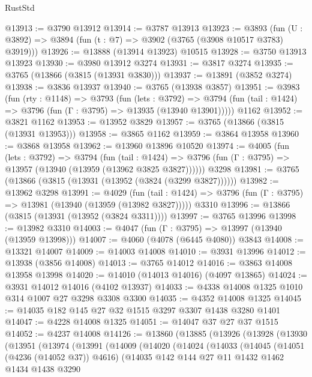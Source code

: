 \begin{lexlean}{RustStd}
\begin{coremodule}
@13913 := @3790 @13912
@13914 := @3787 @13913
@13923 := @3893
    (fun (U : @3892) => @3894 (fun (t : @7) => @3902 (@3765 (@3908 @10517 @3783) @3919)))
@13926 := @13888 (@13914 @13923) @10515
@13928 := @3750 @13913 @13923
@13930 := @3980 @13912 @3274
@13931 := @3817 @3274
@13935 := @3765 (@13866 (@3815 (@13931 @3830)))
@13937 := @13891 (@3852 @3274)
@13938 := @3836 @13937
@13940 := @3765 (@13938 @3857)
@13951 := @3983
    (fun (rty : @1148) =>
    @3793
      (fun (lets : @3792) =>
      @3794 (fun (tail : @1424) => @3796 (fun (Γ : @3795) => @13935 (@13940 @13901)))))
    @1162
@13952 := @3821 @1162
@13953 := @13952 @3829
@13957 := @3765 (@13866 (@3815 (@13931 @13953)))
@13958 := @3865 @1162
@13959 := @3864 @13958
@13960 := @3868 @13958
@13962 := @13960 @13896 @10520
@13974 := @4005
    (fun (lets : @3792) =>
    @3794
      (fun (tail : @1424) =>
      @3796 (fun (Γ : @3795) => @13957 (@13940 (@13959 (@13962 @3825 @3827))))))
    @3298
@13981 := @3765 (@13866 (@3815 (@13931 (@13952 (@3824 (@3299 @3827))))))
@13982 := @13962 @3298
@13991 := @4029
    (fun (tail : @1424) => @3796 (fun (Γ : @3795) => @13981 (@13940 (@13959 (@13982 @3827)))))
    @3310
@13996 := @13866 (@3815 (@13931 (@13952 (@3824 @3311))))
@13997 := @3765 @13996
@13998 := @13982 @3310
@14003 := @4047 (fun (Γ : @3795) => @13997 (@13940 (@13959 @13998)))
@14007 := @4060 (@4078 (@6445 @4080)) @3843
@14008 := @13321 @14007
@14009 := @14003 @14008
@14010 := @3931 @13996
@14012 := @13938 (@3856 @14008)
@14013 := @3765 @14012
@14016 := @3863 @14008 @13958 @13998
@14020 := @14010 (@14013 @14016) (@4097 @13865)
@14024 := @3931 @14012 @14016 (@4102 @13937)
@14033 := @4338 @14008 @1325 @1010 @314 @1007 @27 @3298 @3308 @3300
@14035 := @4352 @14008 @1325
@14045 := @14035 @182 @145 @27 @32 @1515 @3297 @3307 @1438 @3280 @1401
@14047 := @4228 @14008 @1325
@14051 := @14047 @37 @27 @37 @1515
@14052 := @4237 @14008
@14126 := @13860
    (@13885
      (@13926
        (@13928
          (@13930
            (@13951
              (@13974
                (@13991
                  (@14009
                    (@14020
                      (@14024
                        (@14033
                          (@14045
                            (@14051 (@4236 (@14052 @37)) @4616)
                            (@14035
                              @142
                              @144
                              @27
                              @11
                              @1432
                              @1462
                              @1434
                              @1438
                              @3290

\end{coremodule}
\end{lexlean}
